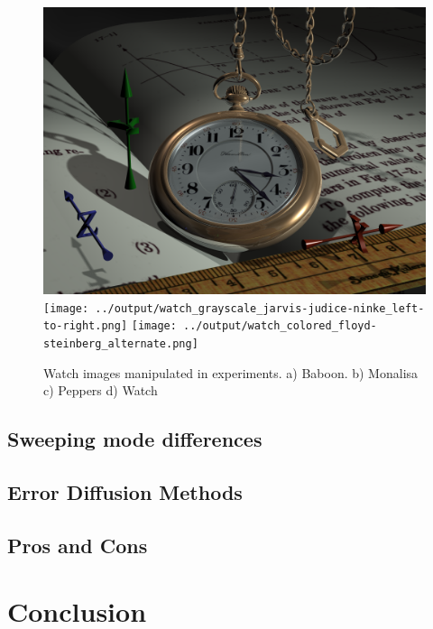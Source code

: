 \documentclass[]{IEEEtran}
\begin{document}
\begin{figure}[H]
  \centering
  \includegraphics[width=0.4\hsize]{../input/watch_colored.png}
  \texttt{[image: ../output/watch\_grayscale\_jarvis-judice-ninke\_left-to-right.png]}
  \texttt{[image: ../output/watch\_colored\_floyd-steinberg\_alternate.png]}
  \caption{Watch images manipulated in experiments. a) Baboon. b) Monalisa c) Peppers d) Watch}
  \label{fig:effect-watch}
\end{figure}

\subsection{Sweeping mode differences}

\subsection{Error Diffusion Methods}

\subsection{Pros and Cons}

\section{Conclusion}
\end{document}
